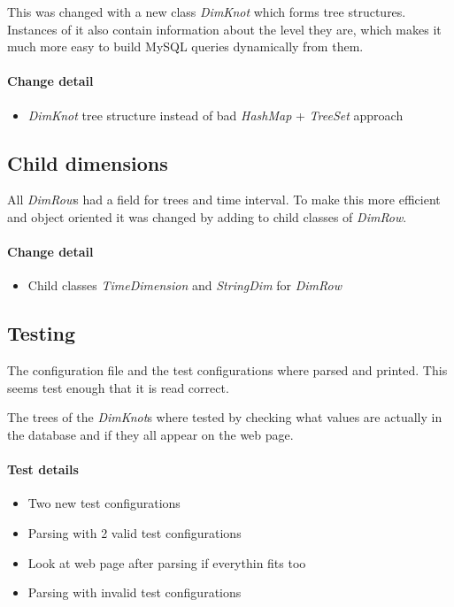 This was changed with a new class \textit{DimKnot} which forms tree structures. 
Instances of it also contain information about the level they are,
which makes it much more easy to build MySQL queries dynamically from them.
\paragraph{Change detail}
\begin{itemize}
  \item \textit{DimKnot} tree structure instead of bad \textit{HashMap} + \textit{TreeSet} approach
\end{itemize}



\subsection{Child dimensions}
All \textit{DimRow}s had a field for trees and time interval. To make this more
efficient and object oriented it was changed
by adding to child classes of \textit{DimRow}.
\paragraph{Change detail}
\begin{itemize}
  \item Child classes \textit{TimeDimension} and \textit{StringDim} for \textit{DimRow}
\end{itemize}

\subsection{Testing}

The configuration file and the test configurations where parsed and printed. 
This seems test enough that it is read correct. 

The trees of the \textit{DimKnot}s where tested by checking what values are actually in the
database and if they all appear on the web page.

\paragraph{Test details}
\begin{itemize}
  \item Two new test configurations
  \item Parsing with 2 valid test configurations
  \item Look at web page after parsing if everythin fits too
  \item Parsing with invalid test configurations
\end{itemize}


